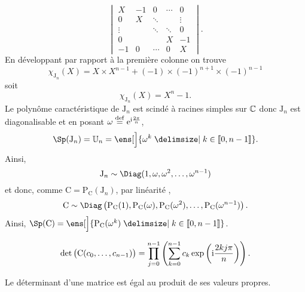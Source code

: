 \begin{demo}
$$\begin{vmatrix}
        X & -1 & 0 & \cdots & 0 \\
        0 & X & \ddots & & \vdots \\
        \vdots & & \ddots & \ddots & 0 \\
        0 & & & X & -1 \\
        -1 & 0 & \cdots & 0 & X
        \end{vmatrix}.
    $$
    En développant par rapport à la première colonne on trouve
    $$\chi_{\mathrm{J}_n}(X) = X \times X^{n-1} + (-1) \times (-1)^{n+1} \times (-1)^{n-1}$$
    soit 
    $$\chi_{\mathrm{J}_n}(X) = X^n-1.$$
    Le polynôme caractéristique de $\mathrm{J}_n$ est scindé à racines simples sur $\mathbb{C}$ donc $\mathrm{J}_n$ est diagonalisable et en posant $\omega \overset{\mathrm{\tiny def}}{=} \mathrm{e}^{\mathrm{i} \frac{2 \pi}{n}}$, 
    $$\Sp(\mathrm{J}_n) = \mathbb{U}_n = \ens[\Big]{ \omega^k \tq k \in \llbracket 0, n-1 \rrbracket }.$$
    Ainsi, 
    $$\mathrm{J}_n \sim \Diag(1, \omega, \omega^2, \dots, \omega^{n-1})$$
    et donc, comme $\mathrm{C} = \mathrm{P}_{\mathrm{C}}(\mathrm{J}_n)$, par linéarité \note, 
    $$\mathrm{C} \sim \Diag \left(\mathrm{P}_\mathrm{C}(1), \mathrm{P}_\mathrm{C}(\omega), \mathrm{P}_\mathrm{C}(\omega^2), \dots,\mathrm{P}_\mathrm{C}(\omega^{n-1}) \right).$$
    Ainsi, $\Sp(\mathrm{C}) = \ens[\Big]{ \mathrm{P}_\mathrm{C}(\omega^k) \tq k \in \llbracket 0, n-1 \rrbracket }$.
\end{demo}    


\begin{prop}
    $$\det \big( \mathrm{C}(c_0, \dots, c_{n-1}) \big) = \prod_{j=0}^{n-1} \left( \sum_{k=0}^{n-1} c_k \exp \left( \mathrm{i} \frac{2kj \pi}{n} \right) \right).$$
\end{prop}

\begin{demo}
    Le déterminant d'une matrice est égal au produit de ses valeurs propres.
\end{demo}

